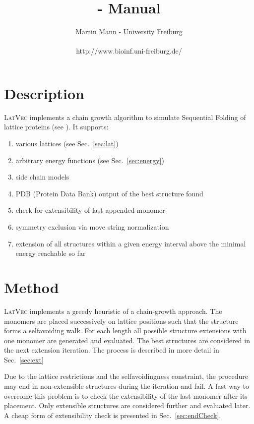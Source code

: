 \documentclass{article}
\title{\latvec{} - Manual}
\date{}
\author{Martin Mann - University Freiburg \\\\
{http://www.bioinf.uni-freiburg.de/}}
\newcommand{\latvec}{\textsc{LatVec}}
\begin{document}
\maketitle



\section{Description}

\latvec{} implements a chain growth algorithm to simulate Sequential Folding
of lattice proteins (see \cite{Mann:latpack:HFSP08}). It supports:
 
\begin{enumerate}
  \item various lattices (see Sec.~\ref{sec:lat})
  \item arbitrary energy functions (see Sec.~\ref{sec:energy})
  \item side chain models
  \item PDB (Protein Data Bank) output of the best structure found
  \item check for extensibility of last appended monomer
  \item symmetry exclusion via move string normalization
  \item extension of all structures within a given energy interval above the
  minimal energy reachable so far
\end{enumerate}

\section{Method}
\label{sec:method}

\latvec{} implements a greedy heuristic of a chain-growth approach. The
mo\-no\-mers are placed successively on lattice positions such that the
structure forms a selfavoiding walk. For each length all possible structure extensions
with one monomer are generated and evaluated. The best structures are considered
in the next extension iteration. The process is described in more detail in
Sec.~\ref{sec:ext}

Due to the lattice restrictions and the selfavoidingness constraint, the
procedure may end in non-extensible structures during the iteration and fail. A
fast way to overcome this problem is to check the extensibility of the last
monomer after its placement. Only extensible structures are considered further
and evaluated later. A cheap form of extensibility check is presented in
Sec.~\ref{sec:endCheck}.
\end{document}
